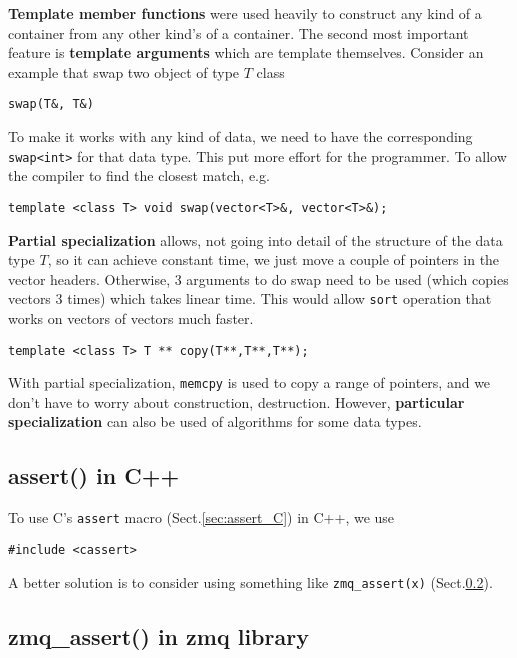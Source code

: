 \begin{mdframed}

{\bf Template member functions} were used heavily to construct any kind of a
container from any other kind's of a container. The second most important feature is
{\bf template arguments} which are template themselves. Consider an example that
swap two object of type $T$ class
\begin{verbatim}
swap(T&, T&)
\end{verbatim}
To make it works with any kind of data, we need to have the corresponding
\verb!swap<int>! for that data type. This put more effort for the programmer.
To allow the compiler to find the closest match, e.g.
\begin{verbatim}
template <class T> void swap(vector<T>&, vector<T>&);
\end{verbatim}

{\bf Partial specialization} allows, not going into detail of the structure of
the data type $T$, so it can achieve constant time, we just move a couple of
pointers in the vector headers. Otherwise, 3 arguments to do swap need to
be used (which copies vectors 3 times) which takes linear time. This would allow
\verb!sort! operation that works on vectors of vectors much faster. 
\begin{verbatim}
template <class T> T ** copy(T**,T**,T**);
\end{verbatim}
With partial specialization, \verb!memcpy! is used to copy a range of pointers,
and we don't have to worry about construction, destruction. However,
{\bf particular specialization} can also be used of algorithms for some data
types.

\end{mdframed}



\subsection{assert() in C++}
\label{sec:assert-in-C++}

To use C's \verb!assert! macro (Sect.\ref{sec:assert_C}) in C++, we use
\begin{verbatim}
#include <cassert>
\end{verbatim}

A better solution is to consider using something like \verb!zmq_assert(x)!
(Sect.\ref{sec:assert-in-zmq}).


\subsection{zmq\_assert() in zmq library}
\label{sec:assert-in-zmq}

